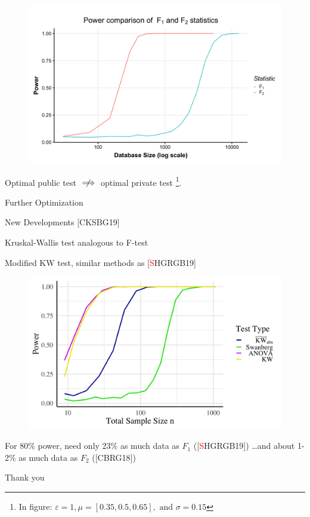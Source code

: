 \documentclass{beamer}
\begin{document}
\begin{frame}{}
  \begin{figure}
  \includegraphics[scale=0.12]{images/f1-vs-f2}
  \end{figure}
  \centering
  \pause
  Optimal public test $\centernot \implies$ optimal private test \footnote{In figure: $\varepsilon = 1, \mu = [0.35, 0.5, 0.65], \text{ and } \sigma = 0.15$}.
\end{frame}

\begin{frame}{Further Optimization}
\end{frame}

\begin{frame}{New Developments [CKSBG19]}

Kruskal-Wallis test analogous to F-test \pause
\bigskip 

Modified KW test, similar methods as [\textcolor{red}{S}HGRGB19] \pause

\begin{figure}
  \includegraphics[scale=0.075]{images/anova_comp}
  \end{figure}
  
  For 80\% power, need only 23\% as much data as $F_1$ ([\textcolor{red}{S}HGRGB19]) \ldots \pause and about 1-2\% as much data as $F_2$ ([CBRG18])
\end{frame}

\begin{frame}{}
    \begin{center}
        \Huge Thank you
    \end{center}    
\end{frame}
\end{document}

